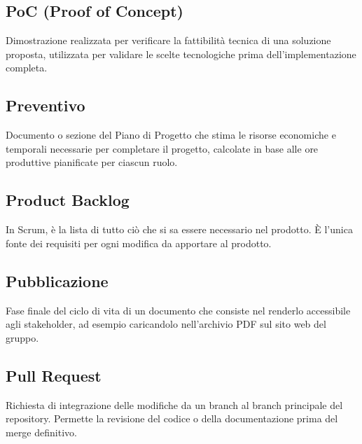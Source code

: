 \documentclass[a4paper, 11pt, oneside]{scrartcl} %
\begin{document}
\subsection*{PoC (Proof of Concept)}


Dimostrazione realizzata per verificare la fattibilità tecnica di una soluzione proposta, utilizzata per validare le scelte tecnologiche prima dell'implementazione completa.

\vspace{0.5cm}

\subsection*{Preventivo}
Documento o sezione del Piano di Progetto che stima le risorse economiche e temporali necessarie per completare il progetto, calcolate in base alle ore produttive pianificate per ciascun ruolo.
\vspace{0.5cm}

\subsection*{Product Backlog}
In Scrum, è la lista di tutto ciò che si sa essere necessario nel prodotto. È l'unica fonte dei requisiti per ogni modifica da apportare al prodotto.
\vspace{0.5cm}

\subsection*{Pubblicazione}


Fase finale del ciclo di vita di un documento che consiste nel renderlo accessibile agli stakeholder, ad esempio caricandolo nell'archivio PDF sul sito web del gruppo.

\vspace{0.5cm}

\subsection*{Pull Request}


Richiesta di integrazione delle modifiche da un branch al branch principale del repository. Permette la revisione del codice o della documentazione prima del merge definitivo.
\end{document}
